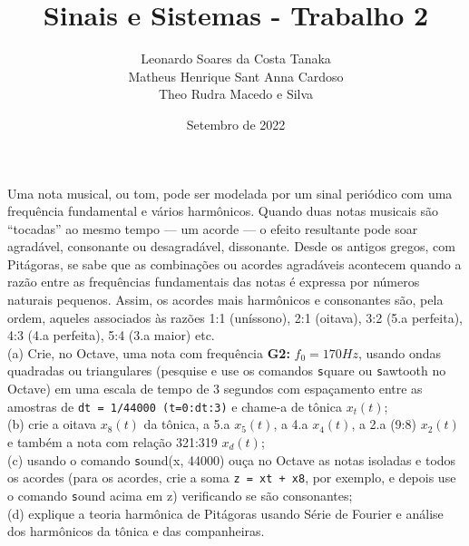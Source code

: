 \documentclass[10pt, a4paper]{article}
\title{Sinais e Sistemas - Trabalho 2}
\author{
    Leonardo Soares da Costa Tanaka\\
    Matheus Henrique Sant Anna Cardoso \\
    Theo Rudra Macedo e Silva
}
\date{Setembro de 2022}
\begin{document}
\maketitle

 Uma nota musical, ou tom, pode ser modelada por um sinal periódico com uma frequência fundamental e vários harmônicos. Quando duas notas musicais são “tocadas” ao mesmo tempo — um acorde — o efeito resultante pode soar agradável, consonante ou desagradável, dissonante. Desde os antigos gregos, com Pitágoras, se sabe que as combinações ou acordes agradáveis acontecem quando a razão entre as frequências fundamentais das notas é expressa por números naturais pequenos. Assim, os acordes mais harmônicos e consonantes são, pela ordem, aqueles associados às razões 1:1 (uníssono), 2:1 (oitava), 3:2 (5.a perfeita), 4:3 (4.a perfeita), 5:4 (3.a maior) etc.\\
(a) Crie, no Octave, uma nota com frequência \textbf{G2:} $f_{0} = 170Hz$, usando ondas quadradas ou triangulares (pesquise e use os comandos {\texttt square} ou {\texttt sawtooth} no Octave) em uma escala de tempo de 3 segundos com espaçamento entre as amostras de {\texttt{dt = 1/44000 (t=0:dt:3)}} e chame-a de tônica $x_{t}(t)$;\\
(b) crie a oitava $x_{8}(t)$ da tônica, a 5.a $x_{5}(t)$, a 4.a $x_{4}(t)$, a 2.a (9:8) $x_{2}(t)$ e também a nota com relação 321:319 $x_{d}(t)$;\\
(c) usando o comando {\texttt sound(x, 44000)} ouça no Octave as notas isoladas e todos os acordes (para os acordes, crie a soma {\texttt{z = xt + x8}}, por exemplo, e depois use o comando {\texttt sound} acima em z) verificando se são consonantes;\\
(d) explique a teoria harmônica de Pitágoras usando Série de Fourier e análise dos harmônicos da tônica e das companheiras.
\end{document}

